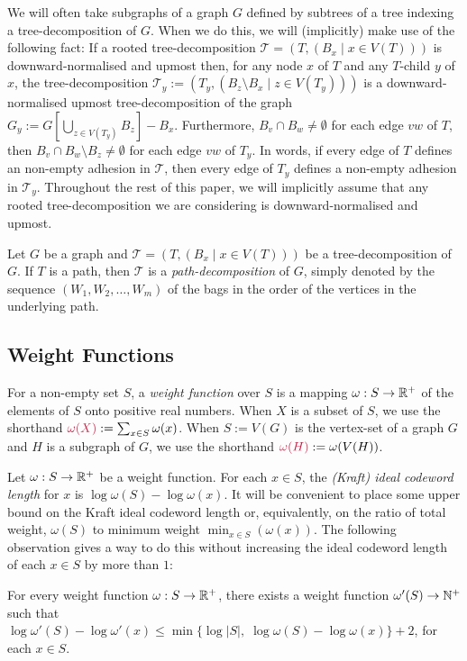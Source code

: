 \documentclass{patmorin}
\makeatletter
\renewcommand{\le}{\leqslant}
\newcommand{\defin}[1]{\emph{\textcolor{brightmaroon}{#1}}}
\def\mathcolor#1#{\@mathcolor{#1}}
\def\@mathcolor#1#2#3{%
  \protect\leavevmode
  \begingroup
    \color#1{#2}#3%
  \endgroup
}
\newcommand{\mathdefin}[1]{\mathcolor{brightmaroon}{#1}}
\newcommand{\calT}{\mathcal{T}}
\makeatother
\begin{document}
  We will often take subgraphs of a graph $G$ defined by subtrees of a tree indexing a tree-decomposition of $G$.  When we do this, we will  (implicitly) make use of the following fact: If a rooted tree-decomposition $\calT=(T,(B_x \mid x\in V(T)))$ is downward-normalised and upmost then, for any node $x$ of $T$ and any $T$-child $y$ of $x$, the tree-decomposition $\calT_y:=(T_y,(B_z\setminus B_x\mid z\in V(T_y)))$ is a downward-normalised upmost tree-decomposition of the graph $G_y:=G[\bigcup_{z\in V(T_y)} B_z]-B_x$.   Furthermore, $B_v\cap B_w\neq\emptyset$ for each edge $vw$ of $T$, then $B_v\cap B_w\setminus B_z\neq\emptyset$ for each edge $vw$ of $T_y$. In words, if every edge of $T$ defines an non-empty adhesion in $\calT$, then every edge of $T_y$ defines a non-empty adhesion in $\calT_y$.  
  Throughout the rest of this paper, we will implicitly assume that any rooted tree-decomposition we are considering is downward-normalised and upmost.  


Let $G$ be a graph and $\calT=(T,(B_x \mid x\in V(T)))$ be a tree-decomposition of $G$.
If $T$ is a path, then $\calT$ is a \defin{path-decomposition} of $G$, simply denoted by the sequence $(W_1, W_2, \dots, W_m)$ of the bags in the order of the vertices in the underlying path.

  \subsection{Weight Functions}

  For a non-empty set $S$, a \defin{weight function} over $S$ is a mapping $\omega:S\to\mathbb{R}^+$ of the elements of $S$ onto positive real numbers.  When $X$ is a subset of $S$, we use the shorthand $\mathdefin{\omega(X)}:=\sum_{x\in S}\omega(x)$.  When $S:=V(G)$ is the vertex-set of a graph $G$ and $H$ is a subgraph of $G$, we use the shorthand $\mathdefin{\omega(H)}:=\omega(V(H))$.  

  Let $\omega:S\to\mathbb{R}^+$ be a weight function.  For each $x\in S$, the \defin{(Kraft) ideal codeword length} for $x$ is $\log\omega(S)-\log\omega(x)$.
  It will be convenient to place some upper bound on the Kraft ideal codeword length or, equivalently, on the ratio of total weight, $\omega(S)$ to minimum weight $\min_{x\in S}(\omega(x))$.  The following observation gives a way to do this without increasing the ideal codeword length of each $x\in S$ by more than $1$:

  \begin{obs}\label{obs:nice}
    For every weight function $\omega:S\to\mathbb{R}^+$, there exists a weight function $\omega'(S)\to\mathbb{N}^+$ such that $\log\omega'(S)-\log\omega'(x)\le\min\{\log|S|,\;\log\omega(S)-\log\omega(x)\}+2$, for each $x\in S$.
  \end{obs}
\end{document}
